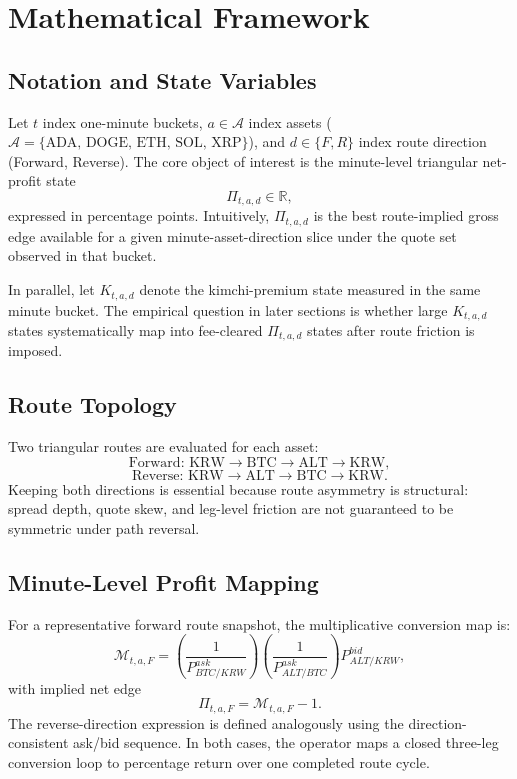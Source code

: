 \documentclass[11pt,a4paper]{article}
\begin{document}
\section{Mathematical Framework}
\subsection{Notation and State Variables}
Let $t$ index one-minute buckets, $a \in \mathcal{A}$ index assets ($\mathcal{A}=\{\text{ADA, DOGE, ETH, SOL, XRP}\}$), and $d\in\{F,R\}$ index route direction (Forward, Reverse). The core object of interest is the minute-level triangular net-profit state
\begin{equation}
\Pi_{t,a,d} \in \mathbb{R},
\end{equation}
expressed in percentage points. Intuitively, $\Pi_{t,a,d}$ is the best route-implied gross edge available for a given minute-asset-direction slice under the quote set observed in that bucket.

In parallel, let $K_{t,a,d}$ denote the kimchi-premium state measured in the same minute bucket. The empirical question in later sections is whether large $K_{t,a,d}$ states systematically map into fee-cleared $\Pi_{t,a,d}$ states after route friction is imposed.

\subsection{Route Topology}
Two triangular routes are evaluated for each asset:
\begin{equation}
\text{Forward: } \mathrm{KRW} \rightarrow \mathrm{BTC} \rightarrow \mathrm{ALT} \rightarrow \mathrm{KRW},
\end{equation}
\begin{equation}
\text{Reverse: } \mathrm{KRW} \rightarrow \mathrm{ALT} \rightarrow \mathrm{BTC} \rightarrow \mathrm{KRW}.
\end{equation}
Keeping both directions is essential because route asymmetry is structural: spread depth, quote skew, and leg-level friction are not guaranteed to be symmetric under path reversal.

\subsection{Minute-Level Profit Mapping}
For a representative forward route snapshot, the multiplicative conversion map is:
\begin{equation}
\mathcal{M}_{t,a,F}
=
\left(\frac{1}{P^{ask}_{BTC/KRW}}\right)
\left(\frac{1}{P^{ask}_{ALT/BTC}}\right)
P^{bid}_{ALT/KRW},
\end{equation}
with implied net edge
\begin{equation}
\Pi_{t,a,F} = \mathcal{M}_{t,a,F} - 1.
\end{equation}
The reverse-direction expression is defined analogously using the direction-consistent ask/bid sequence. In both cases, the operator maps a closed three-leg conversion loop to percentage return over one completed route cycle.
\end{document}
